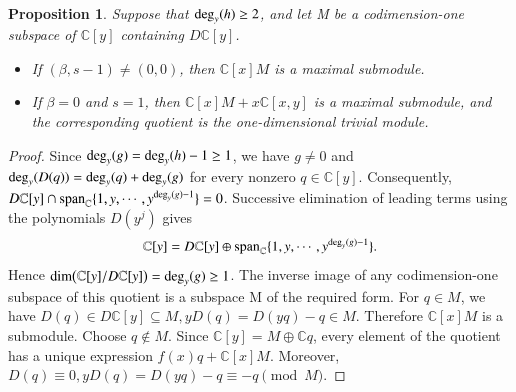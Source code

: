 \documentclass[12pt,reqno]{amsart}
\def\deg{{\rm deg}}
\numberwithin{equation}{section}
\newtheorem{prop}[theo]{Proposition}
\begin{document}
\begin{prop}\label{prop 5.3}
Suppose that ${\deg}_y (h)\ge2$, and let M be a codimension-one subspace of $\mathbb C[y]$ containing $D\mathbb C[y]$.
\begin{itemize}
    \item[(1)]  If $(\beta,s-1)\ne(0,0)$, then $\mathbb C[x]M$ is a maximal submodule.
    \item[(2)] If $\beta=0$ and $s=1$, then $\mathbb C[x]M+x\mathbb C[x,y]$ is a maximal submodule, and the corresponding quotient is the one-dimensional trivial module.
\end{itemize}
\end{prop}
\begin{proof}
Since ${\rm deg}_y (g)={\rm deg}_y (h)-1\ge1$, we have $g\ne 0$ and
${\rm deg}_y(D(q))={\rm deg}_y (q)+{\rm deg}_y (g)$
for every nonzero $q\in\mathbb C[y]$. 
Consequently,
$D\mathbb C[y]\cap
\operatorname{span}_{\mathbb C}\{1,y,\cdots,y^{{\rm deg}_y (g)-1}\}=0$.
Successive elimination of leading terms using the polynomials $D(y^j)$ gives
$$\mathbb C[y]
=
D\mathbb C[y]\oplus
\operatorname{span}_{\mathbb C}\{1,y,\cdots,y^{{\rm deg}_y (g)-1}\}.$$
Hence
$\dim\bigl(\mathbb C[y]/D\mathbb C[y]\bigr)={\rm deg}_y (g)\ge1$. The inverse image of any codimension-one subspace of this quotient is a subspace M of the required form.
For $q\in M$, we have
$D(q)\in D\mathbb C[y]\subseteq M,
yD(q)=D(yq)-q\in M$.
Therefore $\mathbb C[x]M$ is a submodule.
Choose $q\notin M$. Since $\mathbb C[y]=M\oplus\mathbb Cq$, every element of the quotient has a unique expression
$f(x)q+\mathbb C[x]M$.
Moreover,
$D(q)\equiv0, yD(q)=D(yq)-q\equiv-q\pmod M$.














\end{proof}
\end{document}

